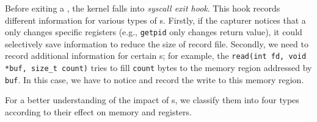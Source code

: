 Before exiting a \syscall{}, the kernel falls into \textit{syscall exit
hook}. This hook records different information for
various types of \syscall{}s. Firstly, if the capturer notices that a
\syscall{} only changes specific registers (e.g., \texttt{getpid} only changes
return value), it could selectively save information to reduce the size of
record file. Secondly, we need to record additional information for
certain \syscall{}s;
for example, the \syscall{} \texttt{read(int fd, void *buf, size\_t count)}
tries to fill \texttt{count} bytes to the memory region addressed by
\texttt{buf}. In this case, we have to notice and record the write to this
memory region. 

For a better understanding of the impact of \syscall{}s, we classify
them into four types according to their effect on memory and registers.

